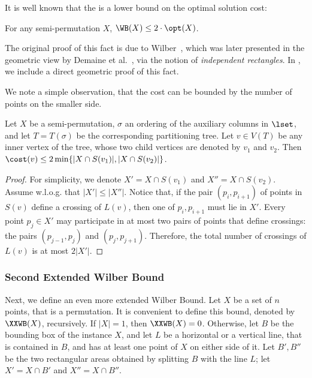It is well known that the \WBone is a lower bound on the optimal solution cost:

\begin{claim}\label{claim: bounding WB by OPT}
	For any semi-permutation $X$, $\WB(X)\leq 2 \cdot \opt(X)$.
\end{claim} 

The original proof of this fact is due to Wilber~\cite{wilber}, which was later presented in the geometric view by Demaine et al.~\cite{DHIKP09}, via the notion of \emph{independent rectangles}. In , we include a direct geometric proof of this fact. 

We note a simple observation, that the cost can be bounded by the number of points on the smaller side.
 
\begin{myobs}\label{obs: number of crossings at most min of both sides}
	Let $X$ be a semi-permutation, $\sigma$ an ordering of the auxiliary columns in $\lset$, and let $T=T({\sigma})$ be the corresponding partitioning tree. Let $v\in V(T)$ be any inner vertex of the tree, whose two child vertices are denoted by $v_1$ and $v_2$. 
Then $\cost(v) \leq 2 \min \{|X \cap S(v_1)|, |X \cap S(v_2)| \}$. 
\end{myobs}
\begin{proof}
For simplicity, we denote $X' =  X \cap S(v_1)$ and $X'' = X \cap S(v_2)$. 
Assume w.l.o.g. that $|X'|\leq |X''|$. Notice that, if the pair $(p_i,p_{i+1})$ of points in $S(v)$ define a crossing of $L(v)$, then one of $p_i,p_{i+1}$ must lie in $X'$. 
Every point $p_j\in X'$ may participate in at most two pairs of points that define crossings: the pairs $(p_{j-1},p_j)$ and $(p_j,p_{j+1})$. 
Therefore, the total number of crossings of $L(v)$ is at most $2|X'|$.
\end{proof}



%

%
%
%
%
%
%
%











\iffalse 
\subsubsection{Second Extended Wilber Bound}
Next, we define an even more extended Wilber Bound. Let $X$ be a set of $n$ points, that is a permutation. It is convenient to define this bound, denoted by $\XXWB(X)$, recursively. If $|X|=1$, then $\XXWB(X)=0$. Otherwise, let $B$ be the bounding box of the instance $X$, and let $L$ be a horizontal or a vertical line, that is contained in $B$, and has at least one point of $X$ on either side of it. Let $B',B''$ be the two rectangular areas obtained by splitting $B$ with the line $L$; let $X'=X\cap B'$ and $X''=X\cap B''$.

